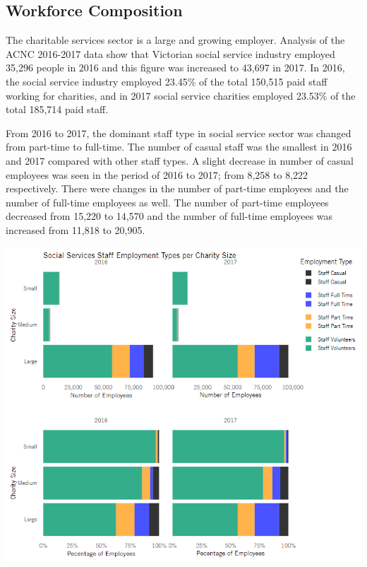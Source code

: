 \documentclass[
  11pt,
]{article}
\let\origfigure\figure
\let\endorigfigure\endfigure
\renewenvironment{figure}[1][2] {
    \expandafter\origfigure\expandafter[H]
} {
    \endorigfigure
}
\begin{document}
\hypertarget{workforce-composition}{%
\subsection{Workforce Composition}\label{workforce-composition}}

The charitable services sector is a large and growing employer. Analysis of the ACNC 2016-2017 data show that Victorian social service industry employed 35,296 people in 2016 and this figure was increased to 43,697 in 2017. In 2016, the social service industry employed 23.45\% of the total 150,515 paid staff working for charities, and in 2017 social service charities employed 23.53\% of the total 185,714 paid staff.

From 2016 to 2017, the dominant staff type in social service sector was changed from part-time to full-time. The number of casual staff was the smallest in 2016 and 2017 compared with other staff types. A slight decrease in number of casual employees was seen in the period of 2016 to 2017; from 8,258 to 8,222 respectively. There were changes in the number of part-time employees and the number of full-time employees as well. The number of part-time employees decreased from 15,220 to 14,570 and the number of full-time employees was increased from 11,818 to 20,905.

\begin{figure}
\centering
\includegraphics{Fig4 CharSize EmployType.PNG}
\caption{Number of Workers in the Social Services Industry by Organisation Size and Employment Status}
\end{figure}
\end{document}
